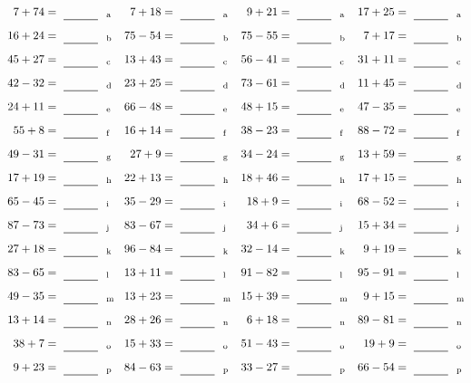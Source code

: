 \documentclass
[
  draft    = true,
  fontsize = 11pt,
  parskip  = half-
]
{scrartcl}
\begin{document}
\clearpage
\begin{align*}
    \pline{7+74}&=\rline{a}
  & \pline{7+18}&=\rline{a}
  & \pline{9+21}&=\rline{a}
  & \pline{17+25}&=\rline{a} \\[1ex]
    \pline{16+24}&=\rline{b}
  & \pline{75-54}&=\rline{b}
  & \pline{75-55}&=\rline{b}
  & \pline{7+17}&=\rline{b} \\[1ex]
    \pline{45+27}&=\rline{c}
  & \pline{13+43}&=\rline{c}
  & \pline{56-41}&=\rline{c}
  & \pline{31+11}&=\rline{c} \\[1ex]
    \pline{42-32}&=\rline{d}
  & \pline{23+25}&=\rline{d}
  & \pline{73-61}&=\rline{d}
  & \pline{11+45}&=\rline{d} \\[1ex]
    \pline{24+11}&=\rline{e}
  & \pline{66-48}&=\rline{e}
  & \pline{48+15}&=\rline{e}
  & \pline{47-35}&=\rline{e} \\[1ex]
    \pline{55+8}&=\rline{f}
  & \pline{16+14}&=\rline{f}
  & \pline{38-23}&=\rline{f}
  & \pline{88-72}&=\rline{f} \\[1ex]
    \pline{49-31}&=\rline{g}
  & \pline{27+9}&=\rline{g}
  & \pline{34-24}&=\rline{g}
  & \pline{13+59}&=\rline{g} \\[1ex]
    \pline{17+19}&=\rline{h}
  & \pline{22+13}&=\rline{h}
  & \pline{18+46}&=\rline{h}
  & \pline{17+15}&=\rline{h} \\[1ex]
    \pline{65-45}&=\rline{i}
  & \pline{35-29}&=\rline{i}
  & \pline{18+9}&=\rline{i}
  & \pline{68-52}&=\rline{i} \\[1ex]
    \pline{87-73}&=\rline{j}
  & \pline{83-67}&=\rline{j}
  & \pline{34+6}&=\rline{j}
  & \pline{15+34}&=\rline{j} \\[1ex]
    \pline{27+18}&=\rline{k}
  & \pline{96-84}&=\rline{k}
  & \pline{32-14}&=\rline{k}
  & \pline{9+19}&=\rline{k} \\[1ex]
    \pline{83-65}&=\rline{l}
  & \pline{13+11}&=\rline{l}
  & \pline{91-82}&=\rline{l}
  & \pline{95-91}&=\rline{l} \\[1ex]
    \pline{49-35}&=\rline{m}
  & \pline{13+23}&=\rline{m}
  & \pline{15+39}&=\rline{m}
  & \pline{9+15}&=\rline{m} \\[1ex]
    \pline{13+14}&=\rline{n}
  & \pline{28+26}&=\rline{n}
  & \pline{6+18}&=\rline{n}
  & \pline{89-81}&=\rline{n} \\[1ex]
    \pline{38+7}&=\rline{o}
  & \pline{15+33}&=\rline{o}
  & \pline{51-43}&=\rline{o}
  & \pline{19+9}&=\rline{o} \\[1ex]
    \pline{9+23}&=\rline{p}
  & \pline{84-63}&=\rline{p}
  & \pline{33-27}&=\rline{p}
  & \pline{66-54}&=\rline{p}
\end{align*}
\end{document}
